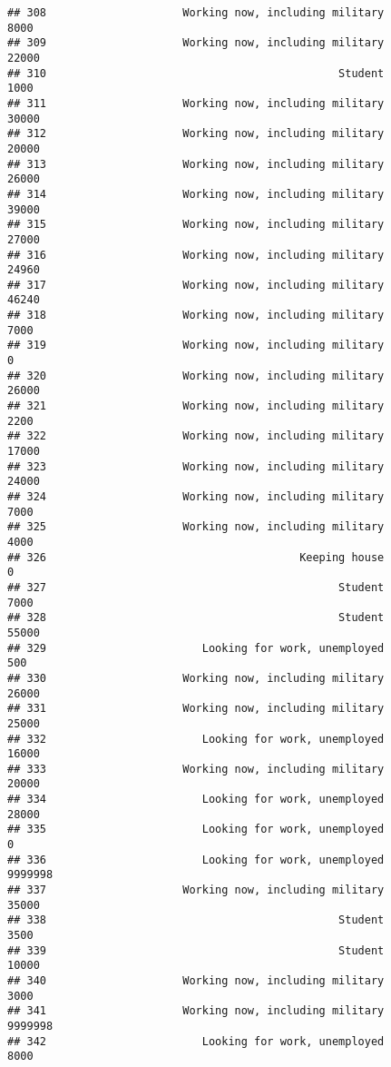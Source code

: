 \documentclass[]{book}
\theoremstyle{definition}
\theoremstyle{definition}
\theoremstyle{remark}
\begin{document}
\begin{verbatim}
## 308                     Working now, including military            8000
## 309                     Working now, including military           22000
## 310                                             Student            1000
## 311                     Working now, including military           30000
## 312                     Working now, including military           20000
## 313                     Working now, including military           26000
## 314                     Working now, including military           39000
## 315                     Working now, including military           27000
## 316                     Working now, including military           24960
## 317                     Working now, including military           46240
## 318                     Working now, including military            7000
## 319                     Working now, including military               0
## 320                     Working now, including military           26000
## 321                     Working now, including military            2200
## 322                     Working now, including military           17000
## 323                     Working now, including military           24000
## 324                     Working now, including military            7000
## 325                     Working now, including military            4000
## 326                                       Keeping house               0
## 327                                             Student            7000
## 328                                             Student           55000
## 329                        Looking for work, unemployed             500
## 330                     Working now, including military           26000
## 331                     Working now, including military           25000
## 332                        Looking for work, unemployed           16000
## 333                     Working now, including military           20000
## 334                        Looking for work, unemployed           28000
## 335                        Looking for work, unemployed               0
## 336                        Looking for work, unemployed         9999998
## 337                     Working now, including military           35000
## 338                                             Student            3500
## 339                                             Student           10000
## 340                     Working now, including military            3000
## 341                     Working now, including military         9999998
## 342                        Looking for work, unemployed            8000

\end{verbatim}
\end{document}
